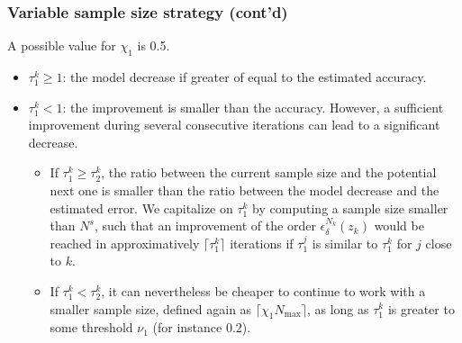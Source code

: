 \documentclass{beamer}
\begin{document}
\begin{frame}
\frametitle{Variable sample size strategy (cont'd)}

A possible value for $\chi_1$ is 0.5.

\begin{itemize}
	\item 
$\tau_1^k \geq 1$: the model decrease if greater of equal to the estimated accuracy.
\item
$\tau_1^k < 1$: the improvement is smaller than the accuracy.
However, %
a sufficient improvement during several consecutive iterations can lead to a significant decrease.%
\begin{itemize}
\item 
If $\tau_1^k \geq \tau_2^k$, the ratio between the current sample size and the potential next one is smaller than the ratio between the model decrease and the estimated error.
We capitalize on $\tau_1^k$ by computing a sample size smaller than  $N^s$, such that an improvement of the order $\epsilon_\delta^{N_k}(z_k)$ would be reached in approximatively $\lceil \tau_1^k \rceil$ iterations if $\tau_1^j$ is similar to $\tau_1^k$ for $j$ close to $k$.
\item
If $\tau_1^k < \tau_2^k$, it can nevertheless be cheaper to continue to work with a smaller sample size, defined again as $\lceil \chi_1 N_{\max} \rceil$, as long as $\tau_1^k$ is greater to some threshold $\nu_1$ (for instance 0.2).
\end{itemize}
\end{itemize}

\end{frame}
\end{document}
